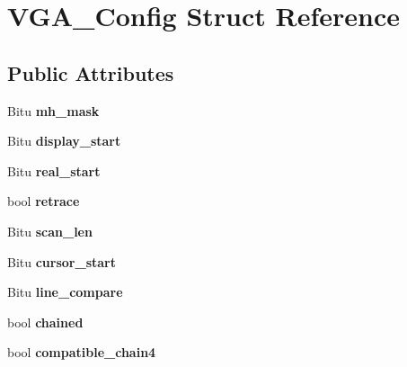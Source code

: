 \hypertarget{structVGA__Config}{\section{V\-G\-A\-\_\-\-Config Struct Reference}
\label{structVGA__Config}
}
\subsection*{Public Attributes}
\begin{DoxyCompactItemize}
\item 
\hypertarget{structVGA__Config_a8c1d5a345efbf1edd4264f217d567113}{Bitu {\bfseries mh\-\_\-mask}}\label{structVGA__Config_a8c1d5a345efbf1edd4264f217d567113}

\item 
\hypertarget{structVGA__Config_a5293b44774bd31cda5e0b044c3e2b126}{Bitu {\bfseries display\-\_\-start}}\label{structVGA__Config_a5293b44774bd31cda5e0b044c3e2b126}

\item 
\hypertarget{structVGA__Config_abe32bdd778f0100c25133a156c68ba08}{Bitu {\bfseries real\-\_\-start}}\label{structVGA__Config_abe32bdd778f0100c25133a156c68ba08}

\item 
\hypertarget{structVGA__Config_af50f74923e0bc8f7e29a6c131a1e835c}{bool {\bfseries retrace}}\label{structVGA__Config_af50f74923e0bc8f7e29a6c131a1e835c}

\item 
\hypertarget{structVGA__Config_a0475ac4a2401fb3aced4cd3fdf306dde}{Bitu {\bfseries scan\-\_\-len}}\label{structVGA__Config_a0475ac4a2401fb3aced4cd3fdf306dde}

\item 
\hypertarget{structVGA__Config_a366ba6eba7835ee30d873b7ae38efedc}{Bitu {\bfseries cursor\-\_\-start}}\label{structVGA__Config_a366ba6eba7835ee30d873b7ae38efedc}

\item 
\hypertarget{structVGA__Config_a3160fcf767aaf3fc1a40a1a9b0b9789e}{Bitu {\bfseries line\-\_\-compare}}\label{structVGA__Config_a3160fcf767aaf3fc1a40a1a9b0b9789e}

\item 
\hypertarget{structVGA__Config_a8507c0d700555dc741fbfd9e330cd535}{bool {\bfseries chained}}\label{structVGA__Config_a8507c0d700555dc741fbfd9e330cd535}

\item 
\hypertarget{structVGA__Config_a61326cde4796a75756cf9304f13d7835}{bool {\bfseries compatible\-\_\-chain4}}\label{structVGA__Config_a61326cde4796a75756cf9304f13d7835}


\end{DoxyCompactItemize}
